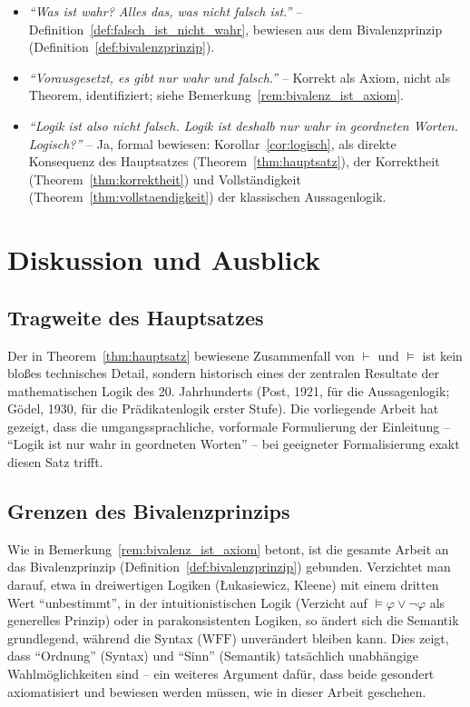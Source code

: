 \documentclass[12pt, a4paper]{article}
\theoremstyle{definition}
\theoremstyle{remark}
\newcommand{\WFF}{\mathrm{WFF}}
\begin{document}
\begin{itemize}
  \item \emph{``Was ist wahr? Alles das, was nicht falsch ist.''} -- Definition~\ref{def:falsch_ist_nicht_wahr}, bewiesen aus dem Bivalenzprinzip (Definition~\ref{def:bivalenzprinzip}).

  \item \emph{``Vorausgesetzt, es gibt nur wahr und falsch.''} -- Korrekt als Axiom, nicht als Theorem, identifiziert; siehe Bemerkung~\ref{rem:bivalenz_ist_axiom}.

  \item \emph{``Logik ist also nicht falsch. Logik ist deshalb nur wahr in geordneten Worten. Logisch?''} -- Ja, formal bewiesen: Korollar~\ref{cor:logisch}, als direkte Konsequenz des Hauptsatzes (Theorem~\ref{thm:hauptsatz}), der Korrektheit (Theorem~\ref{thm:korrektheit}) und Vollständigkeit (Theorem~\ref{thm:vollstaendigkeit}) der klassischen Aussagenlogik.
\end{itemize}

\section{Diskussion und Ausblick}
\label{sec:ausblick}

\subsection{Tragweite des Hauptsatzes}
\label{subsec:tragweite}

Der in Theorem~\ref{thm:hauptsatz} bewiesene Zusammenfall von $\vdash$ und $\models$ ist kein bloßes technisches Detail, sondern historisch eines der zentralen Resultate der mathematischen Logik des 20. Jahrhunderts (Post, 1921, für die Aussagenlogik; Gödel, 1930, für die Prädikatenlogik erster Stufe). Die vorliegende Arbeit hat gezeigt, dass die umgangssprachliche, vorformale Formulierung der Einleitung -- ``Logik ist nur wahr in geordneten Worten'' -- bei geeigneter Formalisierung exakt diesen Satz trifft.

\subsection{Grenzen des Bivalenzprinzips}
\label{subsec:grenzen}

Wie in Bemerkung~\ref{rem:bivalenz_ist_axiom} betont, ist die gesamte Arbeit an das Bivalenzprinzip (Definition~\ref{def:bivalenzprinzip}) gebunden. Verzichtet man darauf, etwa in dreiwertigen Logiken (Łukasiewicz, Kleene) mit einem dritten Wert ``unbestimmt'', in der intuitionistischen Logik (Verzicht auf $\models\varphi\lor\neg\varphi$ als generelles Prinzip) oder in parakonsistenten Logiken, so ändert sich die Semantik grundlegend, während die Syntax ($\WFF$) unverändert bleiben kann. Dies zeigt, dass ``Ordnung'' (Syntax) und ``Sinn'' (Semantik) tatsächlich unabhängige Wahlmöglichkeiten sind -- ein weiteres Argument dafür, dass beide gesondert axiomatisiert und bewiesen werden müssen, wie in dieser Arbeit geschehen.
\end{document}
